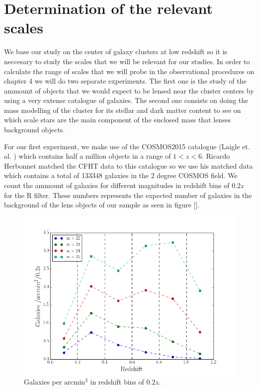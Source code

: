 \chapter{Determination of the relevant scales}

We base our study on the center of galaxy clusters at low redshift so it is neccesary to study the scales that we will be relevant for our studies. In order to calculate the range of scales that we will probe in the observational procedures on chapter 4 we will do two separate experiments. The first one is the study of the ammount of objects that we would expect to be lensed near the cluster centers by using a very extense catalogue of galaxies. The second one consists on doing the mass modelling of the cluster for its stellar and dark matter content to see on which scale stars are the main component of the enclosed mass that lenses background objects.

For our first experiment, we make use of the COSMOS2015 catalogue (Laigle et. al. \citeyear{Reference21}) which contains half a million objects in a range of $1<z<6$. Ricardo Herbonnet matched the CFHT data to this catalogue so we use his matched data which contains a total of 133348 galaxies in the 2 degree COSMOS field. We count the ammount of galaxies for different magnitudes in redshift bins of $0.2z$ for the R filter. These numbers represents the expected number of galaxies in the background of the lens objects of our sample as seen in figure []. 

\begin{figure}[H]
\centering
\includegraphics[width=12cm]{images/galaxies_per_arcmin.png}
\caption[Galaxies per arcmin]{Galaxies per arcmin$^2$ in redshift bins of $0.2z$. }
\end{figure}

